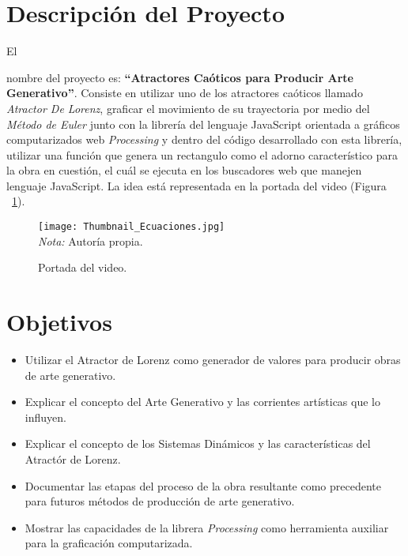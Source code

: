 \documentclass[stu, 12pt, letterpaper, donotrepeattitle, floatsintext]{apa7}
\begin{document}
    \section*{Descripción del Proyecto}
    El \begin{justifying}
      nombre del proyecto es: \textbf{``Atractores Caóticos para Producir Arte Generativo''}. Consiste en utilizar
      uno de los atractores caóticos llamado \emph{Atractor De Lorenz}, graficar el movimiento de su trayectoria por medio del
      \emph{Método de Euler} junto con la librería del lenguaje JavaScript orientada a gráficos computarizados web \emph{Processing} y dentro del código desarrollado con esta librería, utilizar
      una función que genera un rectangulo como el adorno característico para la obra en cuestión, el cuál se ejecuta en los buscadores
      web que manejen lenguaje JavaScript. La idea está representada en la portada del video (Figura ~\ref{fig:video}). %
      \par
    \end{justifying}
    \begin{figure}[H]
      \centering
      \caption{Portada del video.}
      \texttt{[image: Thumbnail\_Ecuaciones.jpg]}
      \\\emph{Nota:} Autoría propia.\label{fig:video}
    \end{figure}
    \section*{Objetivos}
    \begin{itemize}
      \item Utilizar el Atractor de Lorenz como generador de valores para producir obras de arte generativo.
      \item Explicar el concepto del Arte Generativo y las corrientes artísticas que lo influyen.
      \item Explicar el concepto de los Sistemas Dinámicos y las características del Atractór de Lorenz.
      \item Documentar las etapas del proceso de la obra resultante como precedente para futuros métodos de producción de arte generativo.
      \item Mostrar las capacidades de la librera \emph{Processing} como herramienta auxiliar para la graficación computarizada.
    \end{itemize}\par
    \vspace{\baselineskip}
\end{document}
